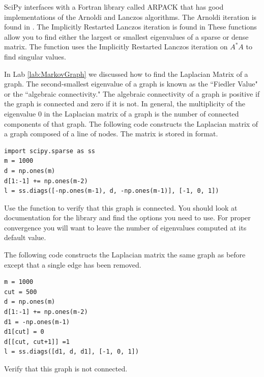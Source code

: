 SciPy interfaces with a Fortran library called ARPACK that has good implementations of the Arnoldi and Lanczos algorithms.
The Arnoldi iteration is found in .
The Implicitly Restarted Lanczos iteration is found in 
These functions allow you to find either the largest or smallest eigenvalues of a sparse or dense matrix.
The function  uses the Implicitly Restarted Lanczos iteration on $A^* A$ to find singular values.

\begin{problem}
In Lab \ref{lab:MarkovGraph} we discussed how to find the Laplacian Matrix of a graph.
The second-smallest eigenvalue of a graph is known as the ``Fiedler Value" or the ``algebraic connectivity."
The algebraic connectivity of a graph is positive if the graph is connected and zero if it is not.
In general, the multiplicity of the eigenvalue $0$ in the Laplacian matrix of a graph is the number of connected components of that graph.
The following code constructs the Laplacian matrix of a graph composed of a line of nodes.
The matrix is stored in  format.
\begin{lstlisting}
import scipy.sparse as ss
m = 1000
d = np.ones(m)
d[1:-1] += np.ones(m-2)
l = ss.diags([-np.ones(m-1), d, -np.ones(m-1)], [-1, 0, 1])
\end{lstlisting}
Use the  function to verify that this graph is connected.
You should look at documentation for the  library and find the options you need to use.
For proper convergence you will want to leave the number of eigenvalues computed at its default value.

The following code constructs the Laplacian matrix the same graph as before except that a single edge has been removed.
\begin{lstlisting}
m = 1000
cut = 500
d = np.ones(m)
d[1:-1] += np.ones(m-2)
d1 = -np.ones(m-1)
d1[cut] = 0
d[[cut, cut+1]] =1
l = ss.diags([d1, d, d1], [-1, 0, 1])
\end{lstlisting}
Verify that this graph is not connected.
\end{problem}

